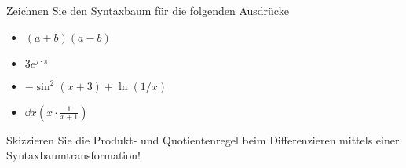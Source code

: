 \item Zeichnen Sie den Syntaxbaum für die folgenden Ausdrücke 

\begin{multicols}{2}
\begin{itemize}
\item $(a+b)(a-b)$
\item $3e^{j\cdot \pi}$
\item $-\sin^2(x+3)+\ln(1/x)$
\item $\dd{}{x} (x\cdot\frac{1}{x+1})$
\end{itemize}
\end{multicols}

Skizzieren Sie die Produkt- und Quotientenregel beim Differenzieren mittels einer Syntaxbaumtransformation!
